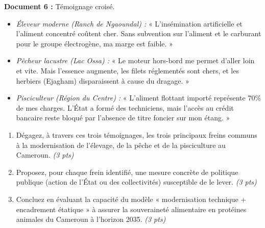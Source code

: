 \documentclass[11pt]{article}
\begin{document}
\begin{exercice}
\textbf{Document 6 :} Témoignage croisé.
\begin{itemize}
    \item \textit{Éleveur moderne (Ranch de Ngaoundal) :} « L'insémination artificielle et l'aliment concentré coûtent cher. Sans subvention sur l'aliment et le carburant pour le groupe électrogène, ma marge est faible. »
    \item \textit{Pêcheur lacustre (Lac Ossa) :} « Le moteur hors-bord me permet d'aller loin et vite. Mais l'essence augmente, les filets réglementés sont chers, et les herbiers (Ejagham) disparaissent à cause du dragage. »
    \item \textit{Pisciculteur (Région du Centre) :} « L'aliment flottant importé représente 70\% de mes charges. L'État a formé des techniciens, mais l'accès au crédit bancaire reste bloqué par l'absence de titre foncier sur mon étang. »
\end{itemize}

\begin{enumerate}
    \item Dégagez, à travers ces trois témoignages, les trois principaux freins communs à la modernisation de l'élevage, de la pêche et de la pisciculture au Cameroun. \textit{(3 pts)}
    \item Proposez, pour chaque frein identifié, une mesure concrète de politique publique (action de l'État ou des collectivités) susceptible de le lever. \textit{(3 pts)}
    \item Concluez en évaluant la capacité du modèle « modernisation technique + encadrement étatique » à assurer la souveraineté alimentaire en protéines animales du Cameroun à l'horizon 2035. \textit{(3 pts)}
\end{enumerate}
\end{exercice}
\end{document}
